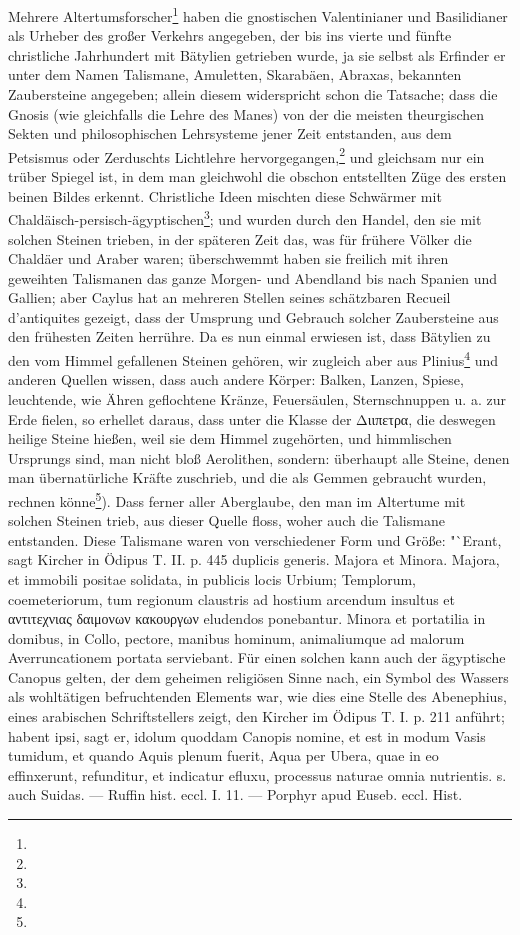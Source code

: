 \documentclass[a4paper, 11pt, oneside, polutonikogreek, german]{article}
\begin{document}
Mehrere Altertumsforscher\footnote{} haben die gnostischen Valentinianer und Basilidianer als Urheber des großer Verkehrs angegeben, der bis ins vierte und fünfte christliche Jahrhundert mit Bätylien getrieben wurde, ja sie selbst als Erfinder er unter dem Namen Talismane, Amuletten, Skarabäen, Abraxas, bekannten Zaubersteine angegeben; allein diesem widerspricht schon die Tatsache; dass die Gnosis (wie gleichfalls die Lehre des Manes) von der die meisten theurgischen Sekten und philosophischen Lehrsysteme jener Zeit entstanden, aus dem Petsismus oder Zerduschts Lichtlehre hervorgegangen,\footnote{} und gleichsam nur ein trüber Spiegel ist, in dem man gleichwohl die obschon entstellten Züge des ersten beinen Bildes erkennt. Christliche Ideen mischten diese Schwärmer mit Chaldäisch-persisch-ägyptischen\footnote{}; und wurden durch den Handel, den sie mit solchen Steinen trieben, in der späteren Zeit das, was für frühere Völker die Chaldäer und Araber waren; überschwemmt haben sie freilich mit ihren geweihten Talismanen das ganze Morgen- und Abendland bis nach Spanien und Gallien; aber Caylus hat an mehreren Stellen seines schätzbaren Recueil d'antiquites gezeigt, dass der Umsprung und Gebrauch solcher Zaubersteine aus den frühesten Zeiten herrühre. Da es nun einmal erwiesen ist, dass Bätylien zu den vom Himmel gefallenen Steinen gehören, wir zugleich aber aus Plinius\footnote{} und anderen Quellen wissen, dass auch andere Körper: Balken, Lanzen, Spiese, leuchtende, wie Ähren geflochtene Kränze, Feuersäulen, Sternschnuppen u. a. zur Erde fielen, so erhellet daraus, dass unter die Klasse der Διιπετρα, die deswegen heilige Steine hießen, weil sie dem Himmel zugehörten, und himmlischen Ursprungs sind, man nicht bloß Aerolithen, sondern: überhaupt alle Steine, denen man übernatürliche Kräfte zuschrieb, und die als Gemmen gebraucht wurden, rechnen könne\footnote{}). Dass ferner aller Aberglaube, den man im Altertume mit solchen Steinen trieb, aus dieser Quelle floss, woher auch die Talismane entstanden. Diese Talismane waren von verschiedener Form und Größe: "`Erant, sagt Kircher in Ödipus T. II. p. 445 duplicis generis. Majora et Minora. Majora, et immobili positae solidata, in publicis locis Urbium; Templorum, coemeteriorum, tum regionum claustris ad hostium arcendum insultus et αντιτεχνιας δαιμονων κακουργων eludendos ponebantur. Minora et portatilia in domibus, in Collo, pectore, manibus hominum, animaliumque ad malorum Averruncationem portata serviebant. Für einen solchen kann auch der ägyptische Canopus gelten, der dem geheimen religiösen Sinne nach, ein Symbol des Wassers als wohltätigen befruchtenden Elements war, wie dies eine Stelle des Abenephius, eines arabischen Schriftstellers zeigt, den Kircher im Ödipus T. I. p. 211 anführt; habent ipsi, sagt er, idolum quoddam Canopis nomine, et est in modum Vasis tumidum, et quando Aquis plenum fuerit, Aqua per Ubera, quae in eo effinxerunt, refunditur, et indicatur efluxu, processus naturae omnia nutrientis. s. auch Suidas. --- Ruffin hist. eccl. I. 11. --- Porphyr apud Euseb. eccl. Hist.
\end{document}
